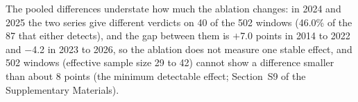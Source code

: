 The pooled differences understate how much the ablation changes: in 2024 and 2025 the two series give different verdicts on 40 of the 502 windows (46.0\% of the 87 that either detects), and the gap between them is $+$7.0 points in 2014 to 2022 and $-$4.2 in 2023 to 2026, so the ablation does not measure one stable effect, and 502 windows (effective sample size 29 to 42) cannot show a difference smaller than about 8 points (the minimum detectable effect; Section~S9 of the Supplementary Materials).

